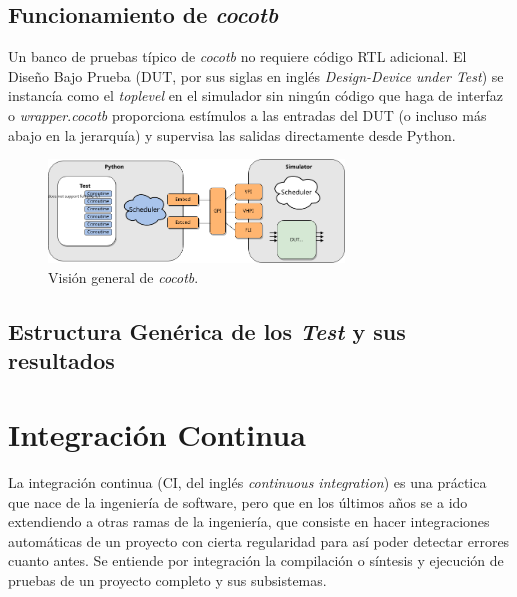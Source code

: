 \subsection{Funcionamiento de \textit{cocotb}}

Un banco de pruebas típico de \textit{cocotb} no requiere código RTL adicional.
El Diseño Bajo Prueba (DUT, por sus siglas en inglés \textit{Design-Device
under Test}) se instancía como el \textit{toplevel} en el simulador sin ningún
código que haga de interfaz o \textit{wrapper}.\textit{cocotb} proporciona
estímulos a las entradas del DUT (o incluso más abajo en la jerarquía) y
supervisa las salidas directamente desde Python.

\begin{figure}[h]
  \centering
  \includegraphics[width=0.7\textwidth]{./Figures/cocotb_overview.png}
  \caption{Visión general de \textit{cocotb}.}
\end{figure}


\subsection{Estructura Genérica de los \textit{Test} y sus resultados}

\section{Integración Continua}

La integración continua (CI, del inglés \textit{continuous integration}) es una
práctica que nace de la ingeniería de software, pero que en los últimos años se
a ido extendiendo a otras ramas de la ingeniería, que consiste en hacer
integraciones automáticas de un proyecto con cierta regularidad para así poder
detectar errores cuanto antes. Se entiende por integración la compilación o
síntesis y ejecución de pruebas de un proyecto completo y sus subsistemas. 


